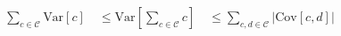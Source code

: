 \begin{align*}
\sum_{c \in \mathcal{C}} \text{Var}[c]
\quad \leq
\text{Var}\left[ \sum_{c \in \mathcal{C}} c \right]
\quad \leq
\sum_{c,d \in \mathcal{C}} \left| \text{Cov}[c, d] \right|
\end{align*}
